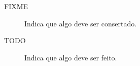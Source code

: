 
\begin{description}
    \item[FIXME] Indica que algo deve ser consertado.
    \item[TODO] Indica que algo deve ser feito.
\end{description}
